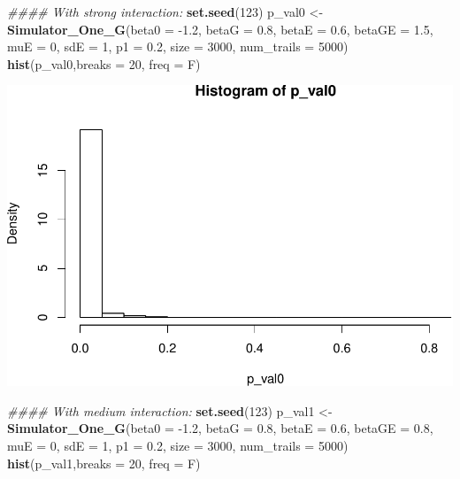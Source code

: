 \documentclass[]{article}
\newenvironment{Shaded}{\begin{snugshade}}{\end{snugshade}}
\newcommand{\CommentTok}[1]{\textcolor[rgb]{0.56,0.35,0.01}{\textit{#1}}}
\newcommand{\DataTypeTok}[1]{\textcolor[rgb]{0.13,0.29,0.53}{#1}}
\newcommand{\DecValTok}[1]{\textcolor[rgb]{0.00,0.00,0.81}{#1}}
\newcommand{\FloatTok}[1]{\textcolor[rgb]{0.00,0.00,0.81}{#1}}
\newcommand{\KeywordTok}[1]{\textcolor[rgb]{0.13,0.29,0.53}{\textbf{#1}}}
\newcommand{\NormalTok}[1]{#1}
\newcommand{\StringTok}[1]{\textcolor[rgb]{0.31,0.60,0.02}{#1}}
\begin{document}
\begin{Shaded}
\begin{Highlighting}[]
\CommentTok{#### With strong interaction:}
\KeywordTok{set.seed}\NormalTok{(}\DecValTok{123}\NormalTok{)}
\NormalTok{p_val0 <-}\StringTok{ }\KeywordTok{Simulator_One_G}\NormalTok{(}\DataTypeTok{beta0 =} \FloatTok{-1.2}\NormalTok{, }\DataTypeTok{betaG =} \FloatTok{0.8}\NormalTok{, }\DataTypeTok{betaE =} \FloatTok{0.6}\NormalTok{, }\DataTypeTok{betaGE =} \FloatTok{1.5}\NormalTok{, }\DataTypeTok{muE =} \DecValTok{0}\NormalTok{, }\DataTypeTok{sdE =} \DecValTok{1}\NormalTok{, }\DataTypeTok{p1 =} \FloatTok{0.2}\NormalTok{, }\DataTypeTok{size =} \DecValTok{3000}\NormalTok{, }\DataTypeTok{num_trails =} \DecValTok{5000}\NormalTok{)}
\KeywordTok{hist}\NormalTok{(p_val0,}\DataTypeTok{breaks =} \DecValTok{20}\NormalTok{, }\DataTypeTok{freq =}\NormalTok{ F)}
\end{Highlighting}
\end{Shaded}

\includegraphics{stats-gene-research-progress-v4_files/figure-latex/unnamed-chunk-1-1.pdf}

\begin{Shaded}
\begin{Highlighting}[]
\CommentTok{#### With medium interaction:}
\KeywordTok{set.seed}\NormalTok{(}\DecValTok{123}\NormalTok{)}
\NormalTok{p_val1 <-}\StringTok{ }\KeywordTok{Simulator_One_G}\NormalTok{(}\DataTypeTok{beta0 =} \FloatTok{-1.2}\NormalTok{, }\DataTypeTok{betaG =} \FloatTok{0.8}\NormalTok{, }\DataTypeTok{betaE =} \FloatTok{0.6}\NormalTok{, }\DataTypeTok{betaGE =} \FloatTok{0.8}\NormalTok{, }\DataTypeTok{muE =} \DecValTok{0}\NormalTok{, }\DataTypeTok{sdE =} \DecValTok{1}\NormalTok{, }\DataTypeTok{p1 =} \FloatTok{0.2}\NormalTok{, }\DataTypeTok{size =} \DecValTok{3000}\NormalTok{, }\DataTypeTok{num_trails =} \DecValTok{5000}\NormalTok{)}
\KeywordTok{hist}\NormalTok{(p_val1,}\DataTypeTok{breaks =} \DecValTok{20}\NormalTok{, }\DataTypeTok{freq =}\NormalTok{ F)}
\end{Highlighting}
\end{Shaded}
\end{document}

